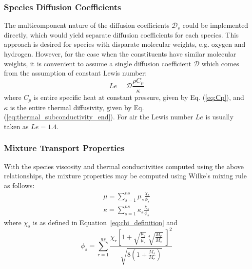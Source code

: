 \documentclass[10pt]{article}
\begin{document}
\subsubsection{Species Diffusion Coefficients}\label{sec:diffusion_coeff}

The multicomponent nature of the diffusion coefficients  $\mathcal{D}_s$
could be implemented directly, which would yield separate diffusion
coefficients for each species.  This approach is desired for species
with disparate molecular weights, e.g.  oxygen and hydrogen.  However,
for the case when the constituents have similar molecular weights, it
is convenient to assume a single diffusion coefficient $\mathcal{D}$
which comes from the assumption of constant Lewis number:
\begin{equation}
  \label{eq:lewis_equilibrium}
  Le = \mathcal{D}\frac{\rho C_p}{\kappa}
\end{equation}
where $C_p$ is entire specific heat at constant pressure, given by Eq. (\ref{eq:Cp}), and $\kappa$ is the entire thermal diffusivity, given by Eq.(\ref{eq:thermal_subconductivity_end}).  For air the Lewis number $Le$ is usually taken
as $Le=1.4$.




\subsubsection{Mixture Transport Properties}
With the species viscosity and thermal conductivities computed using the above relationships, the mixture properties may be computed using Wilke's mixing rule as follows:
\begin{align}
  \label{eq:mixture_viscosity}
  \mu = \sum_{s=1}^{ns} \mu_s\frac{\chi_s}{\phi_s} \\
  \label{eq:mixture_conductivity}
  \kappa   = \sum_{s=1}^{ns}   \kappa_s\frac{\chi_s}{\phi_s} 
\end{align}
where $\chi_s$ is as defined in Equation~\eqref{eq:chi_definition} and
\begin{equation}\label{eq:phi}
  \phi_s = \sum_{r=1}^{ns} \frac{\chi_r \left[1+\sqrt{\frac{\mu_s}{\mu_r}} \sqrt[4]{\frac{M_r}{M_s}}\;\right]^2}{\sqrt{8\left(1+\frac{M_s}{M_r}\right)}}
\end{equation}
\end{document}
